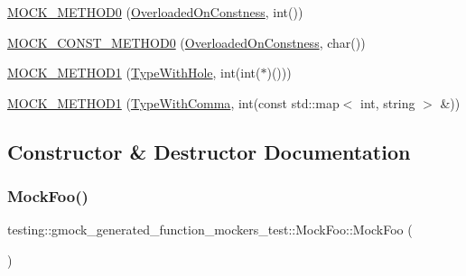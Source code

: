 \begin{DoxyCompactItemize}
\item 
\hyperlink{classtesting_1_1gmock__generated__function__mockers__test_1_1_mock_foo_a291ff46b043d00d0f0acb081c5c36f2e}{M\+O\+C\+K\+\_\+\+M\+E\+T\+H\+O\+D0} (\hyperlink{classtesting_1_1gmock__generated__function__mockers__test_1_1_foo_interface_afbbe6ec72ae237de05e109dea5b03f4f}{Overloaded\+On\+Constness}, int())
\item 
\hyperlink{classtesting_1_1gmock__generated__function__mockers__test_1_1_mock_foo_aa0da575ad3061850662c5f401ddb30c2}{M\+O\+C\+K\+\_\+\+C\+O\+N\+S\+T\+\_\+\+M\+E\+T\+H\+O\+D0} (\hyperlink{classtesting_1_1gmock__generated__function__mockers__test_1_1_foo_interface_afbbe6ec72ae237de05e109dea5b03f4f}{Overloaded\+On\+Constness}, char())
\item 
\hyperlink{classtesting_1_1gmock__generated__function__mockers__test_1_1_mock_foo_a33077a71c1c5178c25b0a4aa099d5f2c}{M\+O\+C\+K\+\_\+\+M\+E\+T\+H\+O\+D1} (\hyperlink{classtesting_1_1gmock__generated__function__mockers__test_1_1_foo_interface_a9e92ef227dc68806f85ebff9c8a6102a}{Type\+With\+Hole}, int(int($\ast$)()))
\item 
\hyperlink{classtesting_1_1gmock__generated__function__mockers__test_1_1_mock_foo_ad07ace4f4288418de7d9740e143da4ef}{M\+O\+C\+K\+\_\+\+M\+E\+T\+H\+O\+D1} (\hyperlink{classtesting_1_1gmock__generated__function__mockers__test_1_1_foo_interface_a654ade1e68b5adb922149898bfe4ccda}{Type\+With\+Comma}, int(const std\+::map$<$ int, string $>$ \&))
\end{DoxyCompactItemize}


\subsection{Constructor \& Destructor Documentation}
\mbox{\label{classtesting_1_1gmock__generated__function__mockers__test_1_1_mock_foo_a05d4aeb00d75b5dbf627a5db2c0ada7f}} 
\subsubsection{\texorpdfstring{Mock\+Foo()}{MockFoo()}}
{\footnotesize\ttfamily testing\+::gmock\+\_\+generated\+\_\+function\+\_\+mockers\+\_\+test\+::\+Mock\+Foo\+::\+Mock\+Foo (\begin{DoxyParamCaption}{ }\end{DoxyParamCaption})\hspace{0.3cm}{\ttfamily [inline]}}



